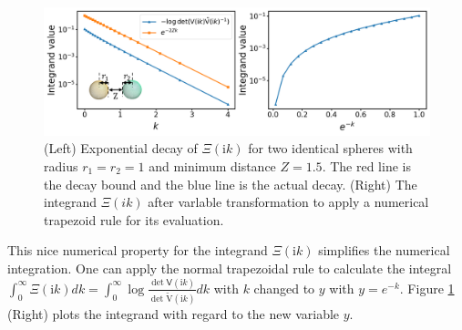 \begin{figure}[H]
    \centering
    \includegraphics[width = \textwidth]{figures/Scalar_integ_decay.png}
    \caption{(Left) Exponential decay of $\Xi(\textrm{i}k)$ for two identical spheres with radius $r_1 = r_2 =1$ and minimum distance $Z=1.5$. The red line is the decay bound and the blue line is the actual decay. (Right) The integrand $\Xi(ik)$ after varlable transformation to apply a numerical trapezoid rule for its evaluation.}
    \label{The integrand decays exponentially}
\end{figure}

This nice numerical property for the integrand $\Xi(\mathrm{i}k)$  simplifies the numerical integration. One can apply the normal trapezoidal rule to calculate the integral 
$\int_{0}^{\infty}\Xi(\mathrm{i}k)dk = \int_{0}^{\infty}\log\frac{\det\mathsf{V}(\mathrm{i}k)}{\det\tilde{\mathrm{V}}(\mathrm{i}k)}dk$ with $k$ changed to $y$ with $y = e^{-k}$. 
Figure \ref{The integrand decays exponentially} (Right) plots the integrand with regard to the new variable $y$.
